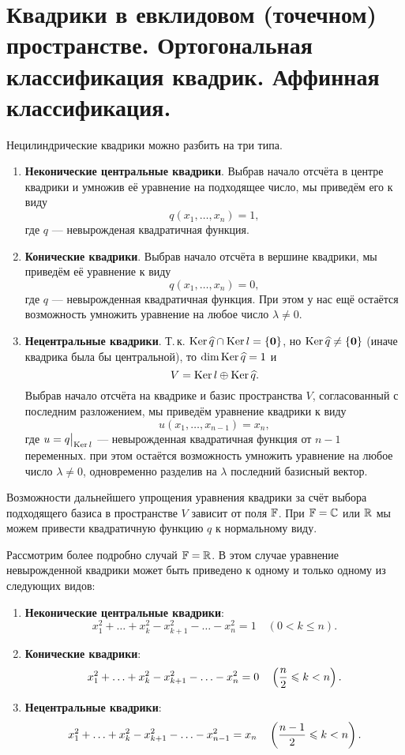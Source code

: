 \section{Квадрики в евклидовом (точечном) пространстве. Ортогональная классификация квадрик. Аффинная классификация.}

Нецилиндрические квадрики можно разбить на три типа.

\begin{enumerate}
    \item \textbf{Неконические центральные квадрики}. Выбрав начало отсчёта в центре квадрики и умножив её уравнение на подходящее число, мы приведём его к виду
        \[
            q(x_1, \ldots, x_n) = 1,
        \]
        где $q$ --- невырожденая квадратичная функция.
    \item \textbf{Конические квадрики}. Выбрав начало отсчёта в вершине квадрики, мы приведём её уравнение к виду
        \[
            q(x_1, \ldots, x_n) = 0,
        \]
        где $q$ --- невырожденная квадратичная функция. При этом у нас ещё остаётся возможность умножить уравнение на любое число $\lambda \ne 0$.
    \item \textbf{Нецентральные квадрики}. Т.\,к. $\operatorname{Ker} \widehat{q} \cap \operatorname{Ker} l = \{\boldsymbol{0}\}$, но $\operatorname{Ker} \widehat{q} \ne \{\boldsymbol{0}\}$ (иначе квадрика была бы центральной), то $\dim \operatorname{Ker} \widehat{q} = 1$ и
        \[
            V = \operatorname{Ker} l \oplus \operatorname{Ker} \widehat{q}.
        \]
        Выбрав начало отсчёта на квадрике и базис пространства $V$, согласованный с последним разложением, мы приведём уравнение квадрики к виду
        \[
            u(x_1, \ldots, x_{n - 1}) = x_n,
        \]
        где $u = q\big|_{\operatorname{Ker} l}$ --- невырожденная квадратичная функция от $n - 1$ переменных. при этом остаётся возможность умножить уравнение на любое число $\lambda \ne 0$, одновременно разделив на $\lambda$ последний базисный вектор.
\end{enumerate}

Возможности дальнейшего упрощения уравнения квадрики за счёт выбора подходящего базиса в пространстве $V$ зависит от поля $\mathbb{F}$. При $\mathbb{F} = \mathbb{C}$ или $\mathbb{R}$ мы можем привести квадратичную функцию $q$ к нормальному виду.

Рассмотрим более подробно случай $\mathbb{F} = \mathbb{R}$. В этом случае уравнение невырожденной квадрики может быть приведено к одному и только одному из следующих видов:
\begin{enumerate}
    \item \textbf{Неконические центральные квадрики}:
        \[
            x_1^2 + \ldots + x_k^2 - x_{k + 1}^2 - \ldots - x_n^2 = 1\quad (0 < k \leqslant n).
        \]
    \item \textbf{Конические квадрики}:
        \[
            x_1^2 + \ldots + x_k^2 - x_{k + 1}^2 - \ldots - x_n^2 = 0\quad\left(\frac{n}{2} \leqslant k < n\right).
        \]
    \item \textbf{Нецентральные квадрики}:
        \[
            x_1^2 + \ldots + x_k^2 - x_{k + 1}^2 - \ldots - x_{n - 1}^2 = x_n\quad\left(\frac{n - 1}{2} \leqslant k < n\right).
        \]
\end{enumerate}

